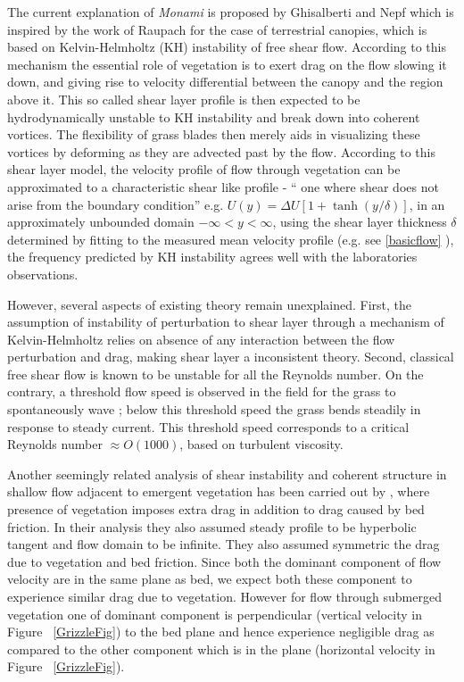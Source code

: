 \documentclass[12pt]{report}   %
\begin{document}
The current explanation of \textit{Monami} is proposed by Ghisalberti and Nepf \cite{Ghisal02,Nepf00} which is inspired by the work of Raupach for the case of terrestrial canopies, which is based on Kelvin-Helmholtz (KH) instability of free shear flow.
According to this mechanism the essential role of vegetation is to exert drag on the flow slowing it down, and giving rise to velocity differential between the canopy and the region above it. This so called shear layer profile is then expected to be hydrodynamically unstable to KH instability and break down into coherent vortices. The flexibility of grass blades then merely aids in visualizing these vortices by deforming as they are advected past by the flow.
According to this shear layer model, the velocity profile of flow through vegetation can be approximated to a characteristic shear like profile - `` one where shear does not arise from the boundary condition'' e.g. $U(y) = \Delta U[1+\tanh(y/\delta)]$, in an approximately unbounded domain $-\infty < y< \infty$, using the shear layer thickness $\delta$ determined by fitting to the measured mean velocity profile (e.g. see \ref{basicflow} ), the frequency predicted by KH instability agrees well with the laboratories observations.

However, several aspects of existing theory remain unexplained. First, the assumption of instability of perturbation to shear layer through a mechanism of Kelvin-Helmholtz relies on absence of any interaction between the flow perturbation and drag, making shear layer a inconsistent theory. Second, classical free shear flow is known to be unstable for all the Reynolds number. On the contrary, a threshold flow speed is observed in the field for the grass to spontaneously wave \cite{Grizzle96}; below this threshold speed the grass bends steadily in response to steady current. This threshold speed corresponds to a  critical Reynolds number $\approx O(1000)$, based on turbulent viscosity. 

Another seemingly related analysis of shear instability and coherent structure in shallow flow adjacent to emergent vegetation has been carried out by \cite{White07}, where presence of vegetation imposes extra drag in addition to drag caused by bed friction. In their analysis they also assumed steady profile to be hyperbolic tangent and flow domain to be infinite. They also assumed symmetric the drag due to vegetation and bed friction. Since both the dominant component of flow velocity are in the same plane as bed, we expect both these component to experience similar drag due to vegetation. However for flow through submerged vegetation one of dominant component is perpendicular (vertical velocity in Figure ~\ref{GrizzleFig}) to the bed plane and hence experience negligible drag as compared to the other component which is in the plane (horizontal velocity in Figure ~\ref{GrizzleFig}).
\end{document}
